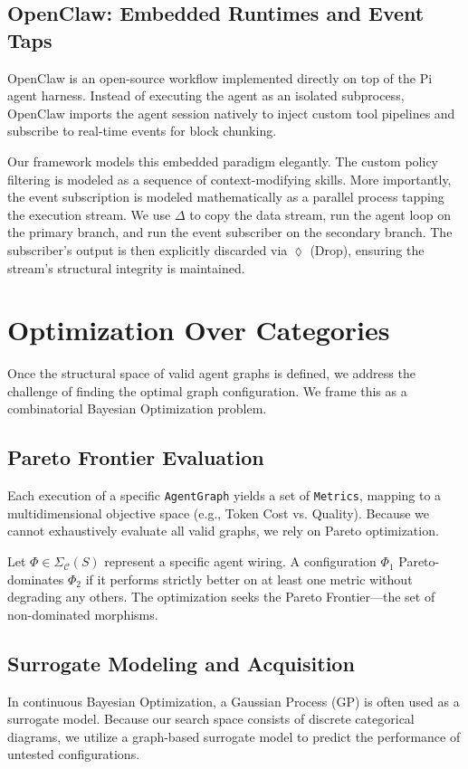 \documentclass[journal]{IEEEtran}
\begin{document}
\subsection{OpenClaw: Embedded Runtimes and Event Taps}
OpenClaw is an open-source workflow implemented directly on top of the Pi agent harness. Instead of executing the agent as an isolated subprocess, OpenClaw imports the agent session natively to inject custom tool pipelines and subscribe to real-time events for block chunking.

Our framework models this embedded paradigm elegantly. The custom policy filtering is modeled as a sequence of context-modifying skills. More importantly, the event subscription is modeled mathematically as a parallel process tapping the execution stream. We use $\Delta$ to copy the data stream, run the agent loop on the primary branch, and run the event subscriber on the secondary branch. The subscriber's output is then explicitly discarded via $\lozenge$ (Drop), ensuring the stream's structural integrity is maintained.

\section{Optimization Over Categories}
\label{sec:opt}

Once the structural space of valid agent graphs is defined, we address the challenge of finding the optimal graph configuration. We frame this as a combinatorial Bayesian Optimization problem.

\subsection{Pareto Frontier Evaluation}
Each execution of a specific \texttt{AgentGraph} yields a set of \texttt{Metrics}, mapping to a multidimensional objective space (e.g., Token Cost vs. Quality). Because we cannot exhaustively evaluate all valid graphs, we rely on Pareto optimization.

Let \(\Phi \in \Sigma_{\mathcal{C}}(S)\) represent a specific agent wiring. A configuration \(\Phi_1\) Pareto-dominates \(\Phi_2\) if it performs strictly better on at least one metric without degrading any others. The optimization seeks the Pareto Frontier---the set of non-dominated morphisms.

\subsection{Surrogate Modeling and Acquisition}
In continuous Bayesian Optimization, a Gaussian Process (GP) is often used as a surrogate model. Because our search space consists of discrete categorical diagrams, we utilize a graph-based surrogate model to predict the performance of untested configurations.
\end{document}
